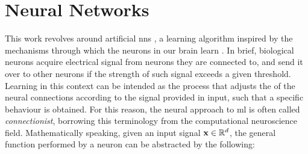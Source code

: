\section{Neural Networks}\label{sec:nn}
This work revolves around artificial \glspl{nn} \citep{haykin2009nnets,goodfellow2016dl}, a learning algorithm inspired by the mechanisms through which the neurons in our brain learn \citep{rosenblatt1958perceptron}. In brief, biological neurons acquire electrical signal from neurons they are connected to, and send it over to other neurons if the strength of such signal exceeds a given threshold. Learning in this context can be intended as the process that adjusts the  of the neural connections according to the signal provided in input, such that a specific behaviour is obtained. For this reason, the neural approach to \gls{ml} is often called \emph{connectionist}, borrowing this terminology from the computational neuroscience field. Mathematically speaking, given an input signal $\Vector{x} \in \Real^d$, the general function performed by a neuron can be abstracted by the following:

